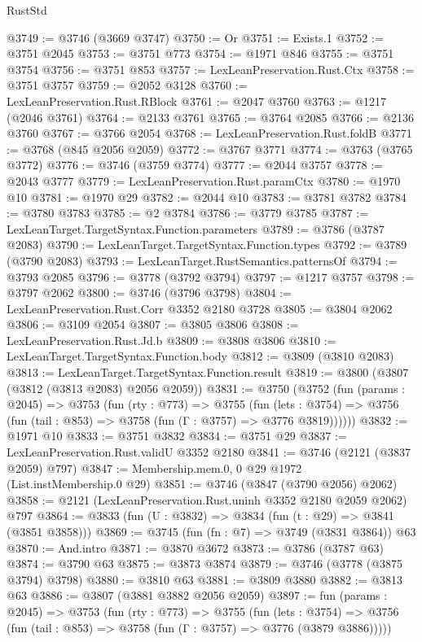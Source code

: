 \begin{lexlean}{RustStd}
\begin{coremodule}
@3749 := @3746 (@3669 @3747)
@3750 := Or
@3751 := Exists.{1}
@3752 := @3751 @2045
@3753 := @3751 @773
@3754 := @1971 @846
@3755 := @3751 @3754
@3756 := @3751 @853
@3757 := LexLeanPreservation.Rust.Ctx
@3758 := @3751 @3757
@3759 := @2052 @3128
@3760 := LexLeanPreservation.Rust.RBlock
@3761 := @2047 @3760
@3763 := @1217 (@2046 @3761)
@3764 := @2133 @3761
@3765 := @3764 @2085
@3766 := @2136 @3760
@3767 := @3766 @2054
@3768 := LexLeanPreservation.Rust.foldB
@3771 := @3768 (@845 @2056 @2059)
@3772 := @3767 @3771
@3774 := @3763 (@3765 @3772)
@3776 := @3746 (@3759 @3774)
@3777 := @2044 @3757
@3778 := @2043 @3777
@3779 := LexLeanPreservation.Rust.paramCtx
@3780 := @1970 @10
@3781 := @1970 @29
@3782 := @2044 @10
@3783 := @3781 @3782
@3784 := @3780 @3783
@3785 := @2 @3784
@3786 := @3779 @3785
@3787 := LexLeanTarget.TargetSyntax.Function.parameters
@3789 := @3786 (@3787 @2083)
@3790 := LexLeanTarget.TargetSyntax.Function.types
@3792 := @3789 (@3790 @2083)
@3793 := LexLeanTarget.RustSemantics.patternsOf
@3794 := @3793 @2085
@3796 := @3778 (@3792 @3794)
@3797 := @1217 @3757
@3798 := @3797 @2062
@3800 := @3746 (@3796 @3798)
@3804 := LexLeanPreservation.Rust.Corr @3352 @2180 @3728
@3805 := @3804 @2062
@3806 := @3109 @2054
@3807 := @3805 @3806
@3808 := LexLeanPreservation.Rust.Jd.b
@3809 := @3808 @3806
@3810 := LexLeanTarget.TargetSyntax.Function.body
@3812 := @3809 (@3810 @2083)
@3813 := LexLeanTarget.TargetSyntax.Function.result
@3819 := @3800 (@3807 (@3812 (@3813 @2083) @2056 @2059))
@3831 := @3750
    (@3752
      (fun (params : @2045) =>
      @3753
        (fun (rty : @773) =>
        @3755
          (fun (lets : @3754) =>
          @3756 (fun (tail : @853) => @3758 (fun (Γ : @3757) => @3776 @3819))))))
@3832 := @1971 @10
@3833 := @3751 @3832
@3834 := @3751 @29
@3837 := LexLeanPreservation.Rust.validU @3352 @2180
@3841 := @3746 (@2121 (@3837 @2059) @797)
@3847 := Membership.mem.{0, 0} @29 @1972 (List.instMembership.{0} @29)
@3851 := @3746 (@3847 (@3790 @2056) @2062)
@3858 := @2121 (LexLeanPreservation.Rust.uninh @3352 @2180 @2059 @2062) @797
@3864 := @3833 (fun (U : @3832) => @3834 (fun (t : @29) => @3841 (@3851 @3858)))
@3869 := @3745 (fun (fn : @7) => @3749 (@3831 @3864)) @63
@3870 := And.intro
@3871 := @3870 @3672
@3873 := @3786 (@3787 @63)
@3874 := @3790 @63
@3875 := @3873 @3874
@3879 := @3746 (@3778 (@3875 @3794) @3798)
@3880 := @3810 @63
@3881 := @3809 @3880
@3882 := @3813 @63
@3886 := @3807 (@3881 @3882 @2056 @2059)
@3897 := fun (params : @2045) =>
  @3753
    (fun (rty : @773) =>
    @3755
      (fun (lets : @3754) =>
      @3756 (fun (tail : @853) => @3758 (fun (Γ : @3757) => @3776 (@3879 @3886)))))

\end{coremodule}
\end{lexlean}
